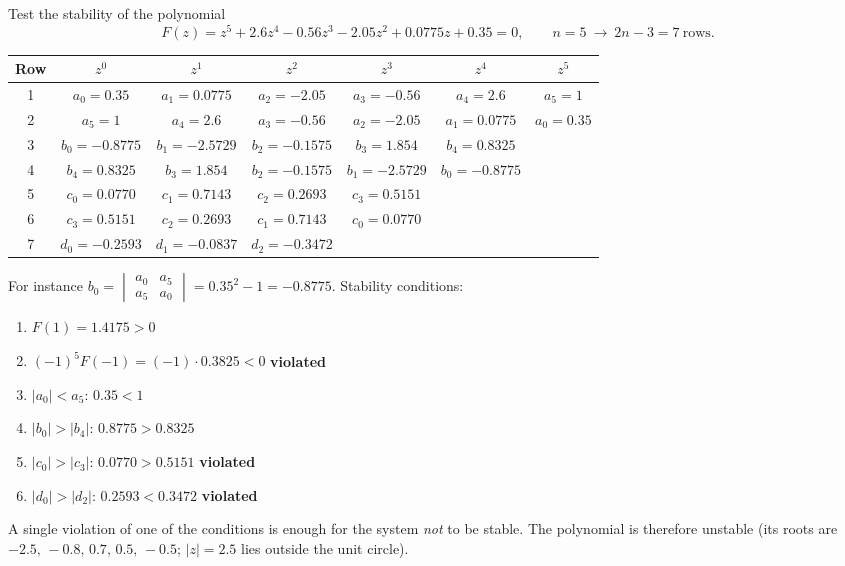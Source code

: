 \begin{example}
Test the stability of the polynomial
\[
  F(z)=z^{5}+2.6z^{4}-0.56z^{3}-2.05z^{2}+0.0775z+0.35=0,\qquad n=5\ \to\ 2n-3=7\ \text{rows.}
\]
\begin{center}
\small
\renewcommand{\arraystretch}{1.25}
\begin{tabular}{c|cccccc}
Row & $z^{0}$ & $z^{1}$ & $z^{2}$ & $z^{3}$ & $z^{4}$ & $z^{5}$\\\hline
1 & $a_0=0.35$ & $a_1=0.0775$ & $a_2=-2.05$ & $a_3=-0.56$ & $a_4=2.6$ & $a_5=1$\\
2 & $a_5=1$ & $a_4=2.6$ & $a_3=-0.56$ & $a_2=-2.05$ & $a_1=0.0775$ & $a_0=0.35$\\
3 & $b_0=-0.8775$ & $b_1=-2.5729$ & $b_2=-0.1575$ & $b_3=1.854$ & $b_4=0.8325$ & \\
4 & $b_4=0.8325$ & $b_3=1.854$ & $b_2=-0.1575$ & $b_1=-2.5729$ & $b_0=-0.8775$ & \\
5 & $c_0=0.0770$ & $c_1=0.7143$ & $c_2=0.2693$ & $c_3=0.5151$ & & \\
6 & $c_3=0.5151$ & $c_2=0.2693$ & $c_1=0.7143$ & $c_0=0.0770$ & & \\
7 & $d_0=-0.2593$ & $d_1=-0.0837$ & $d_2=-0.3472$ & & &
\end{tabular}
\end{center}
For instance $b_0=\begin{vmatrix}a_0&a_5\\a_5&a_0\end{vmatrix}=0.35^{2}-1=-0.8775$. Stability conditions:
\begin{enumerate}
  \item $F(1)=1.4175>0$ \checkmark
  \item $(-1)^{5}F(-1)=(-1)\cdot0.3825<0$ \quad\textbf{\textcolor{boardred}{violated}}
  \item $|a_0|<a_5$: $0.35<1$ \checkmark
  \item $|b_0|>|b_4|$: $0.8775>0.8325$ \checkmark
  \item $|c_0|>|c_3|$: $0.0770>0.5151$ \quad\textbf{\textcolor{boardred}{violated}}
  \item $|d_0|>|d_2|$: $0.2593<0.3472$ \quad\textbf{\textcolor{boardred}{violated}}
\end{enumerate}
A single violation of one of the conditions is enough for the system \emph{not} to be stable. The
polynomial is therefore unstable (its roots are $-2.5,\,-0.8,\,0.7,\,0.5,\,-0.5$; $|z|=2.5$ lies outside the
unit circle).
\end{example}

